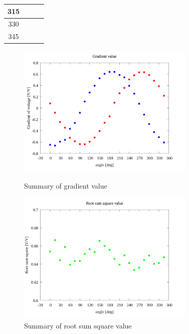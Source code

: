 \documentclass[twocolumn,a4j]{jsarticle}
\begin{document}
\begin{table}[htbp]
\begin{center}
\begin{tabular}{|p{20mm}|p{20mm}|p{20mm}|p{20mm}|}
            \multicolumn{1}{|c|}{315}                   & \multicolumn{1}{|c|}{}              & \multicolumn{1}{|c|}{\textgt{}}    & \multicolumn{1}{|c|}{\textgt{}}\\ \hline
            \multicolumn{1}{|c|}{330}                   & \multicolumn{1}{|c|}{}              & \multicolumn{1}{|c|}{\textgt{}}    & \multicolumn{1}{|c|}{\textgt{}}\\ \hline
            \multicolumn{1}{|c|}{345}                   & \multicolumn{1}{|c|}{}              & \multicolumn{1}{|c|}{\textgt{}}    & \multicolumn{1}{|c|}{\textgt{}}\\ \hline
        \end{tabular}
    \end{center}
\end{table}

\begin{figure}[htbp]
    \footnotesize
    \begin{center}
        \includegraphics[width=85mm]{../images/summary/summary_1.png}
        \caption{Summary of gradient value}
        \includegraphics[width=85mm]{../images/summary/summary_2.png}
        \caption{Summary of root sum square value}
    \end{center}
\end{figure}
\end{document}
